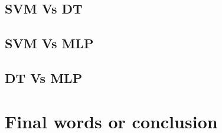 \documentclass{article}
\begin{document}
\begin{multicols}{2}
\subsection{SVM Vs DT} %

\subsection{SVM Vs MLP} %

\subsection{DT Vs MLP}
%

\section{Final words or conclusion}

%
\end{multicols}

\newpage



\end{document}
